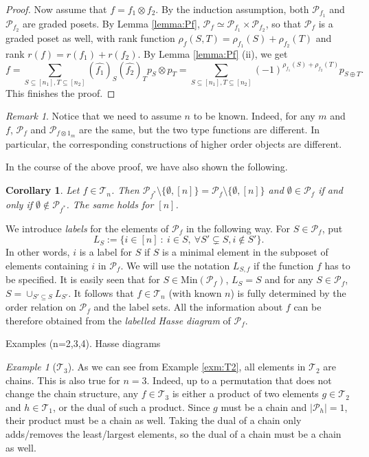 \documentclass[12pt]{article}
\newtheorem{coro}{Corollary}
\theoremstyle{definition}
\theoremstyle{remark}
\newtheorem{remark}{Remark}
\newtheorem{exm}{Example}
\def\Te{\mathcal T}
\def\Pe{\mathcal P}
\begin{document}
\begin{proof}
Now assume that $f=f_1\otimes f_2$. By the induction assumption, both $\Pe_{f_1}$ and $\Pe_{f_2}$ are graded posets. By Lemma
\ref{lemma:Pf}, $\Pe_f\simeq \Pe_{f_1}\times \Pe_{f_2}$, so that $\Pe_f$  is a graded poset as well, with 
rank function $\rho_f(S,T)=\rho_{f_1}(S)+\rho_{f_2}(T)$ and rank $r(f)=r(f_1)+r(f_2)$.
 By Lemma \ref{lemma:Pf} (ii), we get 
\[
f=\sum_{S\subseteq [n_1], T\subseteq [n_2]} (\widehat {f_1})_S(\widehat
{f_2})_T p_S\otimes p_T=
\sum_{S\subseteq [n_1], T\subseteq [n_2]}(-1)^{\rho_{f_1}(S)+\rho_{f_2}(T)}p_{S\oplus T}.
\]
This finishes the proof.

\end{proof}


\begin{remark}\label{remark:n} Notice that we need to assume $n$ to be known. Indeed, for any $m$ and
$f$, $\Pe_f$ and $\Pe_{f\otimes 1_m}$ are the same, but the  two type functions are
different. In particular, the corresponding constructions of higher order
objects are different.

\end{remark}

In the course of the above proof, we have also shown the following.

\begin{coro}\label{coro:pf_dual} Let $f\in \Te_n$. Then $\Pe_{f^*}\setminus
\{\emptyset,[n]\}=\Pe_{f}\setminus
\{\emptyset,[n]\}$ and $\emptyset \in \Pe_f$ if and only if $\emptyset \notin \Pe_{f^*}$.
The same holds for $[n]$.

\end{coro}



We  introduce {\em labels} for the elements of $\Pe_f$ in the following way. 
 For  $S\in \Pe_f$, put
\[
L_S:=\{i\in [n]\ : \ i\in S,\ \forall S'\subsetneq S, i\notin S'\}.
\]
In other words, $i$ is a label for $S$ if $S$ is a minimal element in the subposet of
elements containing $i$ in  $\Pe_f$. 
We will use the notation $L_{S,f}$ if the function $f$ has to be
specified. It is easily seen that for $S\in \mathrm{Min}(\Pe_f)$, $L_S=S$ and for any
$S\in \Pe_f$,  $S=\cup_{S'\subseteq S} L_{S'}$.
It follows that $f\in \Te_n$ (with known $n$) is fully determined by the order relation on $\Pe_f$ and the
label sets. All the information about $f$ can be therefore obtained from the {\em labelled
Hasse diagram} of $\Pe_f$. 

Examples (n=2,3,4). Hasse diagrams
\begin{exm}[$\Te_3$]
As we can see from Example \ref{exm:T2}, all elements in $\Te_2$ are chains. This is
also true for $n=3$. Indeed, up to a permutation that does not change the chain structure, 
any $f\in \Te_3$ is either a product of two elements $g\in \Te_2$ and $h\in \Te_1$,
or the dual of such a  product. Since $g$ must be a chain and $|\Pe_h|=1$, their product
must be a chain as well. Taking the dual of a chain only adds/removes the least/largest
elements, so the dual of a chain must be a chain as well.
\end{exm}
\end{document}
